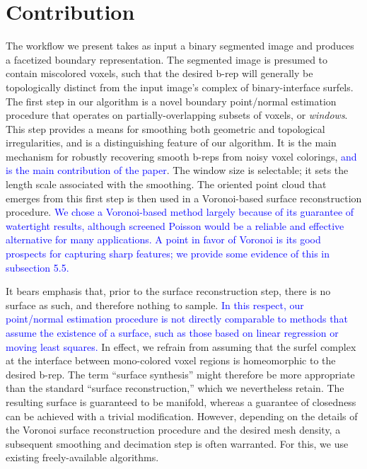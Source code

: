 \section{Contribution}
\label{sec:Contribution}

The workflow we present takes as input a binary segmented image and produces a facetized boundary representation.  The segmented image is presumed to contain miscolored voxels, such that the desired b-rep will generally be topologically distinct from the input image's complex of binary-interface surfels.  The first step in our algorithm is a novel boundary point/normal estimation procedure that operates on partially-overlapping subsets of voxels, or {\em windows}.  This step provides a means for smoothing both geometric and topological irregularities, and is a distinguishing feature of our algorithm.  It is the main mechanism for robustly recovering smooth b-reps from noisy voxel colorings, \textcolor{blue}{and is the main contribution of the paper}.  The window size is selectable; it sets the length scale associated with the smoothing.  The oriented point cloud that emerges from this first step is then used in a Voronoi-based surface reconstruction procedure.  \textcolor{blue}{We chose a Voronoi-based method largely because of its guarantee of watertight results, although screened Poisson would be a reliable and effective alternative for many applications.  A point in favor of Voronoi is its good prospects for capturing sharp features; we provide some evidence of this in subsection 5.5.}  

It bears emphasis that, prior to the surface reconstruction step, there is no surface as such, and therefore nothing to sample.  \textcolor{blue}{In this respect, our point/normal estimation procedure is not directly comparable to methods that assume the existence of a surface, such as those based on linear regression or moving least squares.}  In effect, we refrain from assuming that the surfel complex at the interface between mono-colored voxel regions is homeomorphic to the desired b-rep.  The term ``surface synthesis'' might therefore be more appropriate than the standard ``surface reconstruction,'' which we nevertheless retain. The resulting surface is guaranteed to be manifold, whereas a guarantee of closedness can be achieved with a trivial modification.  However, depending on the details of the Voronoi surface reconstruction procedure and the desired mesh density, a subsequent smoothing and decimation step is often warranted.  For this, we use existing freely-available algorithms.

